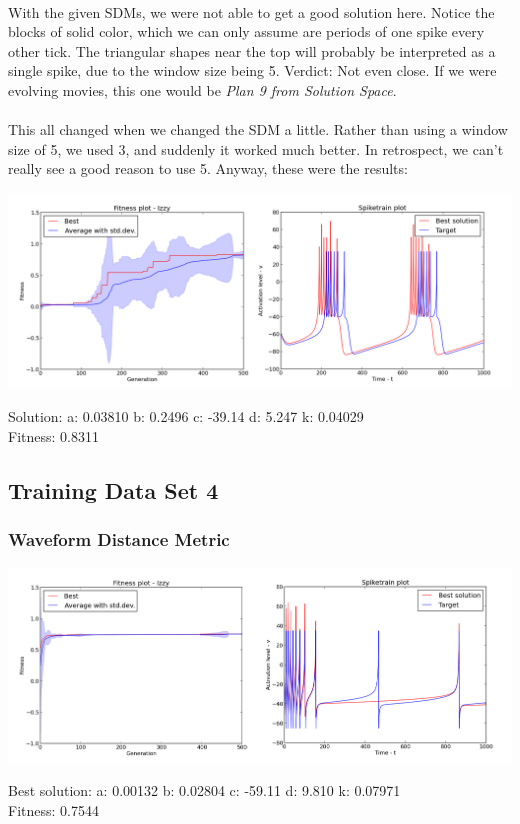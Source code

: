 \documentclass[a4paper,12pt]{article}
\begin{document}
\paragraph{}With the given SDMs, we were not able to get a good solution here. Notice the blocks of solid color, which we can only assume are periods of one spike every other tick. The triangular shapes near the top will probably be interpreted as a single spike, due to the window size being 5. Verdict: Not even close. If we were evolving movies, this one would be \textit{Plan 9 from Solution Space}.
\paragraph{}This all changed when we changed the SDM a little. Rather than using a window size of 5, we used 3, and suddenly it worked much better. In retrospect, we can't really see a good reason to use 5. Anyway, these were the results:\\
\centerline{\includegraphics[width=1.0\textwidth]{img/case3_int_good}}
Solution: 
a: 0.03810 
b: 0.2496 
c: -39.14 
d: 5.247 
k: 0.04029 \\
Fitness: 0.8311

\subsection{Training Data Set 4}
\subsubsection{Waveform Distance Metric}
\centerline{\includegraphics[width=1.0\textwidth]{img/case4_wave}}
Best solution: 
a: 0.00132 
b: 0.02804 
c: -59.11 
d: 9.810 
k: 0.07971 \\
Fitness: 0.7544
\end{document}
